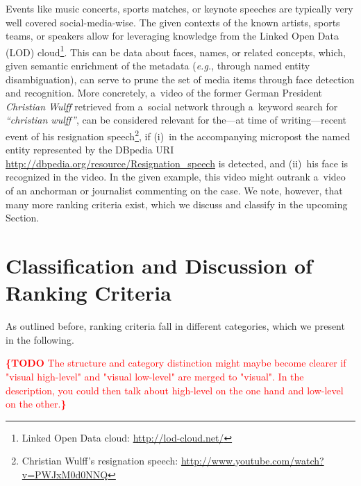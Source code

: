 \documentclass[runningheads,a4paper,11pt]{llncs}
\newcommand{\todo}[1]{\noindent\textcolor{red}{{\bf \{TODO} #1{\bf \}}}}
\begin{document}
Events like music concerts, sports matches, or keynote speeches
are typically very well covered social-media-wise.
The given contexts of the known artists, sports teams, or speakers
allow for leveraging knowledge from the
Linked Open Data (LOD) cloud\footnote{Linked Open Data cloud: \url{http://lod-cloud.net/}}.
This can be data about faces, names, or related concepts,
which, given semantic enrichment of the metadata
(\emph{e.g.}, through named entity disambiguation),
can serve to prune the set of media items
through face detection and recognition.
More concretely, a~video of the former German President \emph{Christian Wulff}
retrieved from a~social network through a~keyword search for \emph{``christian wulff''},
can be considered relevant for the---at time of writing---recent
event of his resignation speech\footnote{Christian Wulff's resignation speech:
\url{http://www.youtube.com/watch?v=PWJxM0d0NNQ}},
if (i)~in the accompanying micropost the named entity represented by the DBpedia URI
\url{http://dbpedia.org/resource/Resignation_speech} is detected,
and (ii)~his face is recognized in the video.
In the given example, this video might outrank a~video
of an anchorman or journalist commenting on the case.
We note, however, that many more ranking criteria exist,
which we discuss and classify in the upcoming Section.

\section{Classification and Discussion of Ranking Criteria}
As outlined before, ranking criteria fall in different categories,
which we present in the following.

\todo{The structure and category distinction might maybe become clearer if "visual high-level" and "visual low-level" are merged to "visual". In the description, you could then talk about high-level on the one hand and low-level on the other.}
\end{document}
